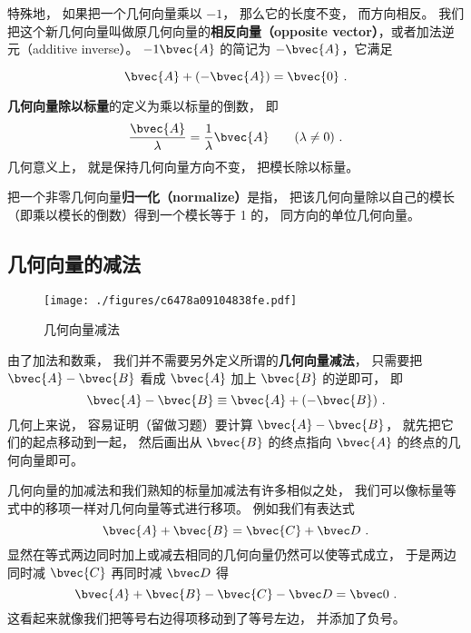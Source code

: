 特殊地， 如果把一个几何向量乘以 $-1$， 那么它的长度不变， 而方向相反。 我们把这个新几何向量叫做原几何向量的\textbf{相反向量（opposite vector）}，或者加法逆元（additive inverse）。 $-1 \bvec{A}$ 的简记为 $-\bvec{A}$，它满足

\begin{equation}
\bvec{A} + (-\bvec{A}) = \bvec{0}~.
\end{equation}

\textbf{几何向量除以标量}的定义为乘以标量的倒数， 即
\begin{equation}
\frac{\bvec{A}}{\lambda} = \frac{1}{\lambda} \bvec{A} \qquad (\lambda \ne 0)~.
\end{equation}
几何意义上， 就是保持几何向量方向不变， 把模长除以标量。

把一个非零几何向量\textbf{归一化（normalize）}是指， 把该几何向量除以自己的模长（即乘以模长的倒数）得到一个模长等于 1 的， 同方向的单位几何向量。

\subsection{几何向量的减法}

\begin{figure}[ht]
\centering
\texttt{[image: ./figures/c6478a09104838fe.pdf]}
\caption{几何向量减法} \label{fig_GVecOp_3}
\end{figure}
由了加法和数乘， 我们并不需要另外定义所谓的\textbf{几何向量减法}， 只需要把 $\bvec{A} - \bvec{B}$ 看成 $\bvec{A}$ 加上 $\bvec{B}$ 的逆即可， 即
\begin{equation}
\bvec{A} - \bvec{B} \equiv \bvec{A} + (-\bvec{B})~.
\end{equation}
几何上来说， 容易证明（留做习题）要计算 $\bvec{A} - \bvec{B}$， 就先把它们的起点移动到一起， 然后画出从 $\bvec{B}$ 的终点指向 $\bvec{A}$ 的终点的几何向量即可。

几何向量的加减法和我们熟知的标量加减法有许多相似之处， 我们可以像标量等式中的移项一样对几何向量等式进行移项。 例如我们有表达式
\begin{equation}
\bvec{A} + \bvec{B} = \bvec{C} + \bvec D~.
\end{equation}
显然在等式两边同时加上或减去相同的几何向量仍然可以使等式成立， 于是两边同时减 $\bvec{C}$ 再同时减 $\bvec D$ 得
\begin{equation}
\bvec{A} + \bvec{B} - \bvec{C} - \bvec D = \bvec 0~.
\end{equation}
这看起来就像我们把等号右边得项移动到了等号左边， 并添加了负号。

